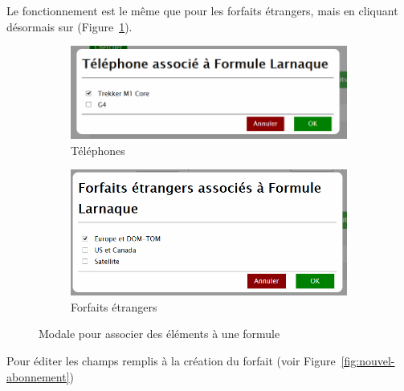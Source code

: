 Le fonctionnement est le même que pour les forfaits étrangers, mais en cliquant désormais sur \faMobilePhone{} (Figure~\ref{fig:assoc-telephone}).

\begin{figure}[ht]
  \centering
  \begin{subfigure}{.57\textwidth}
    \centering
    \includegraphics[width=\textwidth]{images/Plateforme/assoc_telephone}
    \caption{Téléphones}
    \label{fig:assoc-telephone}
  \end{subfigure}\hfill%
  \begin{subfigure}{.4\textwidth}
    \centering
    \includegraphics[width=\textwidth]{images/Plateforme/assoc_foreign}
    \caption{Forfaits étrangers}
    \label{fig:assoc-foreign}
  \end{subfigure}
  \caption{Modale pour associer des éléments à une formule}
\end{figure}

Pour éditer les champs remplis à la création du forfait (voir Figure~\ref{fig:nouvel-abonnement})

